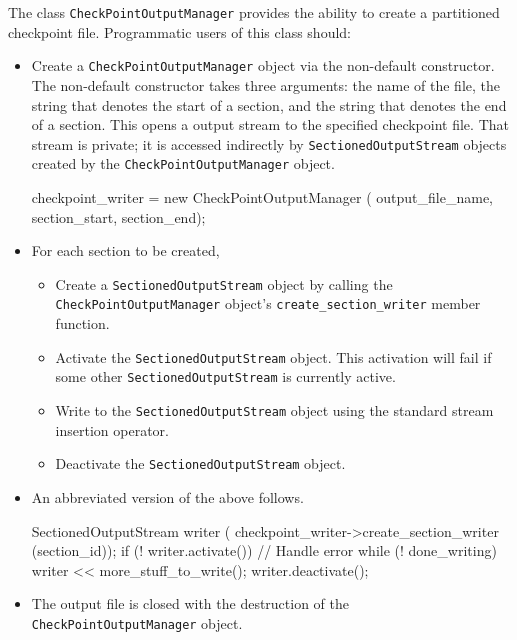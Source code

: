 The class \verb|CheckPointOutputManager| provides the ability to create a
partitioned checkpoint file.
Programmatic users of this class should:
\begin{itemize}
\item Create a \verb|CheckPointOutputManager| object via the non-default
constructor. The non-default constructor takes three arguments:
the name of the file,
the string that denotes the start of a section, and
the string that denotes the end of a section.
This opens a \Cplusplus output stream to  the specified checkpoint file.
That stream is private; it is accessed indirectly by
\verb|SectionedOutputStream| objects created by the
\verb|CheckPointOutputManager| object.
\begin{codeblock}
checkpoint_writer = new CheckPointOutputManager (
   output_file_name, section_start, section_end);
\end{codeblock}

\item For each section to be created,
\begin{itemize}
\item Create a \verb|SectionedOutputStream| object
by calling the \verb|CheckPointOutputManager| object's
\verb|create_section_writer| member function.
\item Activate the \verb|SectionedOutputStream| object.
This activation will fail if some other \verb|SectionedOutputStream|
is currently active.
\item Write to the \verb|SectionedOutputStream| object using
the standard \Cplusplus stream insertion operator.
\item Deactivate the \verb|SectionedOutputStream| object.
\end{itemize}
\item An abbreviated version of the above follows.
\begin{codeblock}
SectionedOutputStream writer (
   checkpoint_writer->create_section_writer (section_id));
if (! writer.activate()) {
   // Handle error
}
while (! done_writing) {
   writer << more_stuff_to_write();
}
writer.deactivate();
\end{codeblock}

\item The output file is closed with the destruction of the
\verb|CheckPointOutputManager| object.
\end{itemize}


